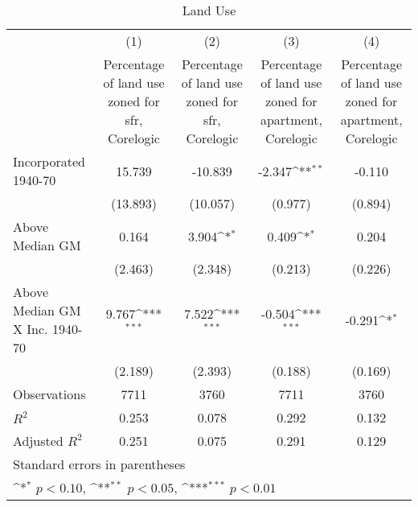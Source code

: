 \begin{table}[htbp]\centering
\def\sym#1{\ifmmode^{#1}\else\(^{#1}\)\fi}
\caption{Land Use}
\begin{tabular}{l*{4}{c}}
\hline\hline
                    &\multicolumn{1}{c}{(1)}&\multicolumn{1}{c}{(2)}&\multicolumn{1}{c}{(3)}&\multicolumn{1}{c}{(4)}\\
                    &\multicolumn{1}{c}{Percentage of land use zoned for sfr, Corelogic}&\multicolumn{1}{c}{Percentage of land use zoned for sfr, Corelogic}&\multicolumn{1}{c}{Percentage of land use zoned for apartment, Corelogic}&\multicolumn{1}{c}{Percentage of land use zoned for apartment, Corelogic}\\
\hline
Incorporated 1940-70&      15.739         &     -10.839         &      -2.347\sym{**} &      -0.110         \\
                    &    (13.893)         &    (10.057)         &     (0.977)         &     (0.894)         \\
[1em]
Above Median GM     &       0.164         &       3.904\sym{*}  &       0.409\sym{*}  &       0.204         \\
                    &     (2.463)         &     (2.348)         &     (0.213)         &     (0.226)         \\
[1em]
Above Median GM X Inc. 1940-70&       9.767\sym{***}&       7.522\sym{***}&      -0.504\sym{***}&      -0.291\sym{*}  \\
                    &     (2.189)         &     (2.393)         &     (0.188)         &     (0.169)         \\
\hline
Observations        &        7711         &        3760         &        7711         &        3760         \\
\(R^{2}\)           &       0.253         &       0.078         &       0.292         &       0.132         \\
Adjusted \(R^{2}\)  &       0.251         &       0.075         &       0.291         &       0.129         \\
\hline\hline
\multicolumn{5}{l}{\footnotesize Standard errors in parentheses}\\
\multicolumn{5}{l}{\footnotesize \sym{*} \(p<0.10\), \sym{**} \(p<0.05\), \sym{***} \(p<0.01\)}\\
\end{tabular}
\end{table}
